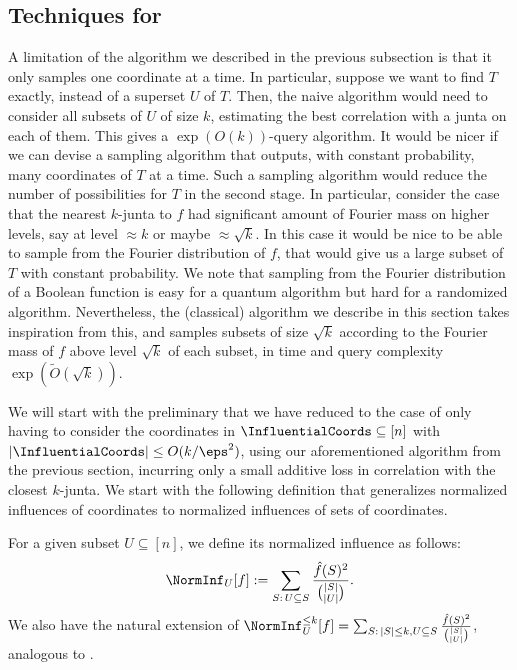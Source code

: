 \subsection{Techniques for }
\label{subsection:main-results-techniques}



A limitation of the algorithm we described in the previous subsection is that it only samples one coordinate at a time. 
In particular, suppose we want to find $T$ exactly, instead of a superset $U$ of $T$. Then, the naive algorithm would need to consider all subsets of $U$ of size $k$, estimating the best correlation with a junta on each of them. This gives a $\exp(O(k))$-query algorithm.
It would be nicer if we can devise a sampling algorithm that outputs, with constant probability, many coordinates of $T$ at a time. Such a sampling algorithm would reduce the number of possibilities for $T$ in the second stage.
In particular, consider the case that the nearest $k$-junta to $f$ had significant amount of Fourier mass on higher levels, say at level $\approx k$ or maybe $\approx \sqrt{k}$. In this case it would be nice to be able to sample from the Fourier distribution of $f$, that would give us a large subset of $T$ with constant probability. We note that sampling from the Fourier distribution of a Boolean function is easy for a quantum algorithm but hard for a randomized algorithm. Nevertheless, the (classical) algorithm we describe in this section takes inspiration from this, and samples subsets of size $\sqrt{k}$ according to the Fourier mass of $f$ above level $\sqrt{k}$ of each subset, in time and query complexity $\exp(\tilde{O}(\sqrt{k}))$. 

We will start with the preliminary that we have reduced to the case of only having to consider the coordinates in $\InfluentialCoords \subseteq [n]$ with $|\InfluentialCoords| \leq O(k/\eps^2)$, using our aforementioned algorithm from the previous section, incurring only a small additive loss in correlation with the closest $k$-junta. We start with the following definition that generalizes normalized influences of coordinates to normalized influences of sets of coordinates.
\begin{definition}
\label{definition:norm-influences-general}
For a given subset $U \subseteq [n]$, we define its normalized influence as follows:
$$\NormInf_U[f] := \sum_{S:\, U \subseteq S} \frac{\hat{f}(S)^2}{\binom{|S|}{|U|}}.$$
We also have the natural extension of $\NormInf_U^{\leq k}[f] = \sum_{S:\,|S|\le k, U \subseteq S} \frac{\hat{f}(S)^2}{\binom{|S|}{|U|}}$, analogous to .
\end{definition}

